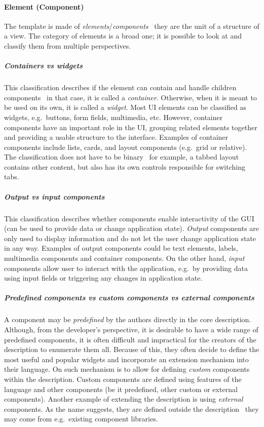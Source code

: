 \paragraph{Element (Component)}
The template is made of \emph{elements}/\emph{components} \textendash\ they are the unit of a structure of a view.
The category of elements is a broad one;
it is possible to look at and classify them from multiple perspectives.

\subparagraph{Containers vs widgets}
This classification describes if the element can contain and handle children components \textendash\ in that case, it is called a \emph{container}.
Otherwise, when it is meant to be used on its own, it is called a \emph{widget}.
Most UI elements can be classified as widgets, e.g.\ buttons, form fields, multimedia, etc.
However, container components have an important role in the UI, grouping related elements together and providing a usable structure to the interface.
Examples of container components include lists, cards, and layout components (e.g.\ grid or relative).
The classification does not have to be binary \textendash\ for example, a tabbed layout contains other content, but also has its own controls responsible for switching tabs.

\subparagraph{Output vs input components}
This classification describes whether components enable interactivity of the GUI (can be used to provide data or change application state).
\emph{Output} components are only used to display information and do not let the user change application state in any way.
Examples of output components could be text elements, labels, multimedia components and container components.
On the other hand, \emph{input} components allow user to interact with the application, e.g.\ by providing data using input fields or triggering any changes in application state.

\subparagraph{Predefined components vs custom components vs external components}
A component may be \emph{predefined} by the authors directly in the core description.
Although, from the developer's perspective, it is desirable to have a wide range of predefined components, it is often difficult and impractical for the creators of the description to enumerate them all.
Because of this, they often decide to define the most useful and popular widgets and incorporate an extension mechanism into their language.
On such mechanism is to allow for defining \emph{custom} components within the description.
Custom components are defined using features of the language and other components (be it predefined, other custom or external components).
Another example of extending the description is using \emph{external} components.
As the name suggests, they are defined outside the description \textendash\ they may come from e.g.\ existing component libraries.

